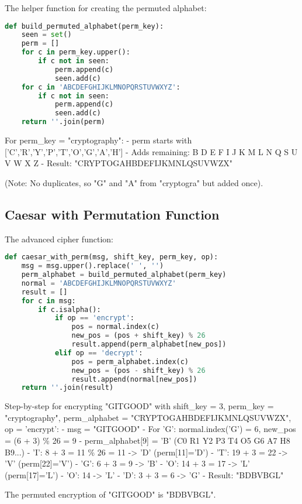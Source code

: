 The helper function for creating the permuted alphabet:

\begin{lstlisting}[language=Python]
def build_permuted_alphabet(perm_key):
    seen = set()
    perm = []
    for c in perm_key.upper():
        if c not in seen:
            perm.append(c)
            seen.add(c)
    for c in 'ABCDEFGHIJKLMNOPQRSTUVWXYZ':
        if c not in seen:
            perm.append(c)
            seen.add(c)
    return ''.join(perm)
\end{lstlisting}

For perm\_key = "cryptography":
- perm starts with ['C','R','Y','P','T','O','G','A','H']
- Adds remaining: B D E F I J K M L N Q S U V W X Z
- Result: "CRYPTOGAHBDEFIJKMNLQSUVWZX"

(Note: No duplicates, so "G" and "A" from "cryptogra" but added once).

\subsection{Caesar with Permutation Function}

The advanced cipher function:

\begin{lstlisting}[language=Python]
def caesar_with_perm(msg, shift_key, perm_key, op):
    msg = msg.upper().replace(' ', '')
    perm_alphabet = build_permuted_alphabet(perm_key)
    normal = 'ABCDEFGHIJKLMNOPQRSTUVWXYZ'
    result = []
    for c in msg:
        if c.isalpha():
            if op == 'encrypt':
                pos = normal.index(c)
                new_pos = (pos + shift_key) % 26
                result.append(perm_alphabet[new_pos])
            elif op == 'decrypt':
                pos = perm_alphabet.index(c)
                new_pos = (pos - shift_key) % 26
                result.append(normal[new_pos])
    return ''.join(result)
\end{lstlisting}

Step-by-step for encrypting "GITGOOD" with shift\_key = 3, perm\_key = "cryptography", perm\_alphabet = "CRYPTOGAHBDEFIJKMNLQSUVWZX", op = 'encrypt':
- msg = "GITGOOD"
- For 'G': normal.index('G') = 6, new\_pos = (6 + 3) \% 26 = 9
- perm\_alphabet[9] = 'B' (C0 R1 Y2 P3 T4 O5 G6 A7 H8 B9...)
- 'I': 8 + 3 = 11 \% 26 = 11 -> 'D' (perm[11]='D')
- 'T': 19 + 3 = 22 -> 'V' (perm[22]='V')
- 'G': 6 + 3 = 9 -> 'B'
- 'O': 14 + 3 = 17 -> 'L' (perm[17]='L')
- 'O': 14 -> 'L'
- 'D': 3 + 3 = 6 -> 'G'
- Result: "BDBVBGL"

The permuted encryption of "GITGOOD" is "BDBVBGL".

